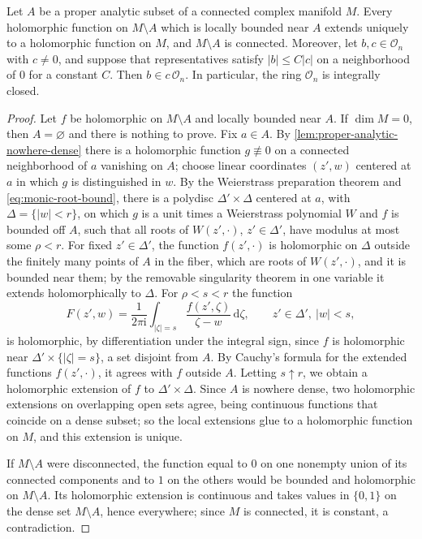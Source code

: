 \begin{lemma}\label{lem:bounded-holomorphic-removal}
Let $A$ be a proper analytic subset of a connected complex manifold $M$. Every holomorphic function on $M\setminus A$ which is locally bounded near $A$ extends uniquely to a holomorphic function on $M$, and $M\setminus A$ is connected. Moreover, let $b,c\in\mathcal O_n$ with $c\neq0$, and suppose that representatives satisfy $|b|\leq C|c|$ on a neighborhood of $0$ for a constant $C$. Then $b\in c\,\mathcal O_n$. In particular, the ring $\mathcal O_n$ is integrally closed.
\end{lemma}
\begin{proof}
Let $f$ be holomorphic on $M\setminus A$ and locally bounded near $A$. If $\dim M=0$, then $A=\varnothing$ and there is nothing to prove. Fix $a\in A$. By \cref{lem:proper-analytic-nowhere-dense} there is a holomorphic function $g\not\equiv0$ on a connected neighborhood of $a$ vanishing on $A$; choose linear coordinates $(z',w)$ centered at $a$ in which $g$ is distinguished in $w$. By the Weierstrass preparation theorem and \eqref{eq:monic-root-bound}, there is a polydisc $\Delta'\times\Delta$ centered at $a$, with $\Delta=\{|w|<r\}$, on which $g$ is a unit times a Weierstrass polynomial $W$ and $f$ is bounded off $A$, such that all roots of $W(z',\cdot)$, $z'\in\Delta'$, have modulus at most some $\rho<r$. For fixed $z'\in\Delta'$, the function $f(z',\cdot)$ is holomorphic on $\Delta$ outside the finitely many points of $A$ in the fiber, which are roots of $W(z',\cdot)$, and it is bounded near them; by the removable singularity theorem in one variable it extends holomorphically to $\Delta$. For $\rho<s<r$ the function
\[
 F(z',w)=\frac1{2\pi\mathrm i}\int_{|\zeta|=s}\frac{f(z',\zeta)}{\zeta-w}\,\mathrm d\zeta,\qquad z'\in\Delta',\ |w|<s,
\]
is holomorphic, by differentiation under the integral sign, since $f$ is holomorphic near $\Delta'\times\{|\zeta|=s\}$, a set disjoint from $A$. By Cauchy's formula for the extended functions $f(z',\cdot)$, it agrees with $f$ outside $A$. Letting $s\uparrow r$, we obtain a holomorphic extension of $f$ to $\Delta'\times\Delta$. Since $A$ is nowhere dense, two holomorphic extensions on overlapping open sets agree, being continuous functions that coincide on a dense subset; so the local extensions glue to a holomorphic function on $M$, and this extension is unique.

If $M\setminus A$ were disconnected, the function equal to $0$ on one nonempty union of its connected components and to $1$ on the others would be bounded and holomorphic on $M\setminus A$. Its holomorphic extension is continuous and takes values in $\{0,1\}$ on the dense set $M\setminus A$, hence everywhere; since $M$ is connected, it is constant, a contradiction.


\end{proof}
